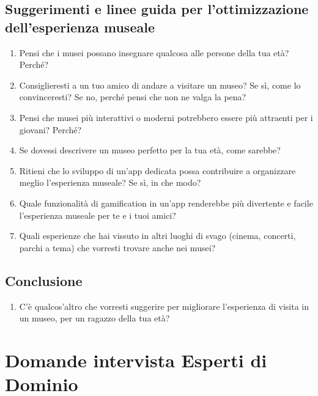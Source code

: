 \documentclass[a4paper, 12pt]{article}
\begin{document}
\subsection{\textcolor{subsectioncolor}{Suggerimenti e linee guida per l'ottimizzazione \\ dell'esperienza museale}}
\begin{enumerate}[label=\textcolor{textcolor}{\arabic*.}]
    \item \textcolor{textcolor}{Pensi che i musei possano insegnare qualcosa alle persone della tua età? Perché?}
    \item \textcolor{textcolor}{Consiglieresti a un tuo amico di andare a visitare un museo? Se sì, come lo convinceresti? Se no, perché pensi che non ne valga la pena?}
    \item \textcolor{textcolor}{Pensi che musei più interattivi o moderni potrebbero essere più attraenti per i giovani? Perché?}
    \item \textcolor{textcolor}{Se dovessi descrivere un museo perfetto per la tua età, come sarebbe?}
    \item \textcolor{textcolor}{Ritieni che lo sviluppo di un'app dedicata possa contribuire a organizzare meglio l'esperienza museale? Se sì, in che modo?}
    \item \textcolor{textcolor}{Quale funzionalità di gamification in un’app renderebbe più divertente e facile l’esperienza museale per te e i tuoi amici?}
    \item \textcolor{textcolor}{Quali esperienze che hai vissuto in altri luoghi di svago (cinema, concerti, parchi a tema) che vorresti trovare anche nei musei?}
\end{enumerate}

\subsection{\textcolor{subsectioncolor}{Conclusione}}
\begin{enumerate}
    \item C'è qualcos'altro che vorresti suggerire per migliorare l'esperienza di visita in un museo, per un ragazzo della tua età?
\end{enumerate}

\newpage

\section{\textcolor{sectioncolor}{Domande intervista Esperti di Dominio}}
\end{document}

